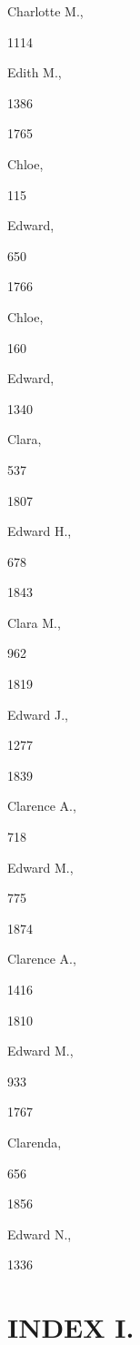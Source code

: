 \documentclass{book}
\begin{document}
Charlotte M., 


1114 




Edith M., 


1386 


1765 


Chloe, 


115 




Edward, 


650 


1766 


Chloe, 


160 




Edward, 


1340 




Clara, 


537 


1807 


Edward H., 


678 


1843 


Clara M., 


962 


1819 


Edward J., 


1277 


1839 


Clarence A., 


718 




Edward M., 


775 


1874 


Clarence A., 


1416 


1810 


Edward M., 


933 


1767 


Clarenda, 


656 


1856 


Edward N., 


1336 







\chapter{INDEX I.}
\end{document}
